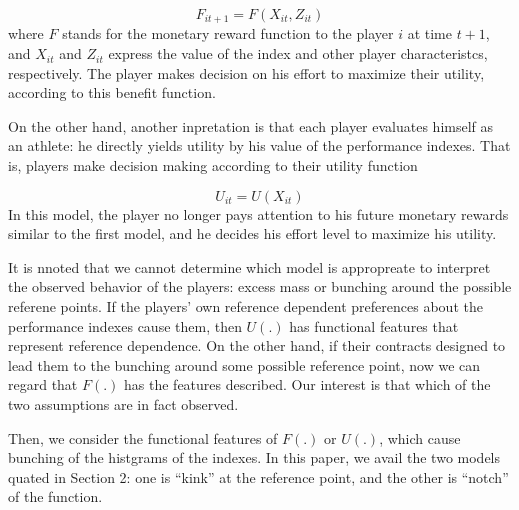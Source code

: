 \documentclass[dvipdfmx, 12pt]{article}
\begin{document}
\[
F_{it+1} = F(X_{it}, Z_{it})
\]
where $F$ stands for the monetary reward function to the player $i$ at time $t+1$, and $X_{it}$ and $Z_{it}$ express the value of the index and other player characteristcs, respectively. The player makes decision on his effort to maximize their utility, according to this benefit function.

On the other hand, another inpretation is that each player evaluates himself as an athlete: he directly yields utility by his value of the performance indexes. That is, players make decision making according to their utility function

\[
U_{it} = U(X_{it})
\]
In this model, the player no longer pays attention to his future monetary rewards similar to the first model, and he decides his effort level to maximize his utility.

It is nnoted that we cannot determine which model is appropreate to interpret the observed behavior of the players: excess mass or bunching around the possible referene points. If the players' own reference dependent preferences about the performance indexes cause them,  then $U(.)$ has functional features that represent reference dependence. On the other hand, if their contracts designed to lead them to the bunching around some possible reference point, now we can regard that $F(.)$ has the features described. Our interest is that which of the two assumptions are in fact observed.

Then, we consider the functional features of $F(.)$ or $U(.)$, which cause bunching of the histgrams of the indexes. In this paper, we avail the two models quated in Section 2: one is ``kink'' at the reference point, and the other is ``notch'' of the function.
\end{document}
